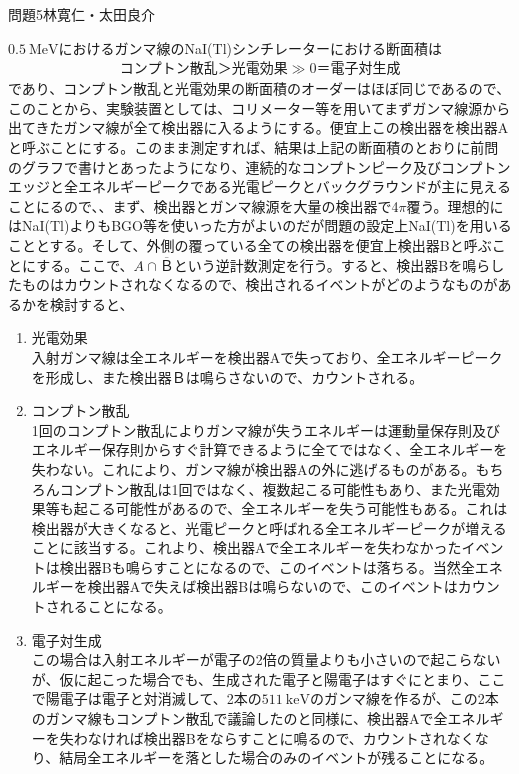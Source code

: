 \documentclass[fleqn]{jbook}
\begin{document}
\begin{answer}{問題5}{林寛仁・太田良介}
\begin{enumerate}
$0.5 \ \mathrm{MeV}$におけるガンマ線のNaI(Tl)シンチレーターにおける断面積は\\
\begin{eqnarray}
	コンプトン散乱＞光電効果\gg 0＝電子対生成	\nonumber
\end{eqnarray}
であり、コンプトン散乱と光電効果の断面積のオーダーはほぼ同じであるので、このことから、実験装置としては、コリメーター等を用いてまずガンマ線源から出てきたガンマ線が全て検出器に入るようにする。便宜上この検出器を検出器Aと呼ぶことにする。このまま測定すれば、結果は上記の断面積のとおりに前問のグラフで書けとあったようになり、連続的なコンプトンピーク及びコンプトンエッジと全エネルギーピークである光電ピークとバックグラウンドが主に見えることにるので、、まず、検出器とガンマ線源を大量の検出器で4$\pi$覆う。理想的にはNaI(Tl)よりもBGO等を使いった方がよいのだが問題の設定上NaI(Tl)を用いることとする。そして、外側の覆っている全ての検出器を便宜上検出器Bと呼ぶことにする。ここで、$A∩\overline{Ｂ}$という逆計数測定を行う。すると、検出器Bを鳴らしたものはカウントされなくなるので、検出されるイベントがどのようなものがあるかを検討すると、
\begin{enumerate}
\item
光電効果\\
入射ガンマ線は全エネルギーを検出器Aで失っており、全エネルギーピークを形成し、また検出器Ｂは鳴らさないので、カウントされる。
\item
コンプトン散乱\\
1回のコンプトン散乱によりガンマ線が失うエネルギーは運動量保存則及びエネルギー保存則からすぐ計算できるように全てではなく、全エネルギーを失わない。これにより、ガンマ線が検出器Aの外に逃げるものがある。もちろんコンプトン散乱は1回ではなく、複数起こる可能性もあり、また光電効果等も起こる可能性があるので、全エネルギーを失う可能性もある。これは検出器が大きくなると、光電ピークと呼ばれる全エネルギーピークが増えることに該当する。これより、検出器Aで全エネルギーを失わなかったイベントは検出器Bも鳴らすことになるので、このイベントは落ちる。当然全エネルギーを検出器Aで失えば検出器Bは鳴らないので、このイベントはカウントされることになる。
\item
電子対生成\\
この場合は入射エネルギーが電子の2倍の質量よりも小さいので起こらないが、仮に起こった場合でも、生成された電子と陽電子はすぐにとまり、ここで陽電子は電子と対消滅して、2本の$511 \ \mathrm{keV}$のガンマ線を作るが、この2本のガンマ線もコンプトン散乱で議論したのと同様に、検出器Aで全エネルギーを失わなければ検出器Bをならすことに鳴るので、カウントされなくなり、結局全エネルギーを落とした場合のみのイベントが残ることになる。

\end{enumerate}
\end{enumerate}
\end{answer}
\end{document}
